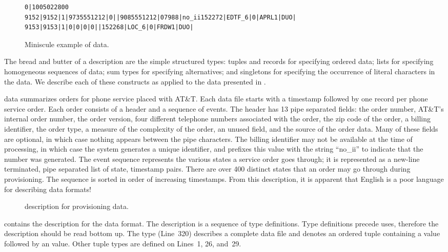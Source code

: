 \begin{figure*}
{\scriptsize
\begin{verbatim}
0|1005022800
9152|9152|1|9735551212|0||9085551212|07988|no_ii152272|EDTF_6|0|APRL1|DUO|
9153|9153|1|0|0|0|0||152268|LOC_6|0|FRDW1|DUO|
\end{verbatim}
}
  \caption{Miniscule example of \dibbler{} data.}
  \label{figure:dibbler-records}
\end{figure*}

The bread and butter of a \padsml{} description are the simple
structured types: tuples and records for specifying ordered data;
lists for specifying homogeneous sequences of data; sum types for
specifying alternatives; and singletons for specifying the occurrence
of literal characters in the data.  We describe each of these
constructs as applied to the \dibbler{} data presented in
.

\dibbler{} data summarizes orders for phone service placed with AT\&T.
Each \dibbler{} data file starts with a timestamp followed by one
record per phone service order.  Each order consists of a header and a
sequence of events.  The header has 13 pipe separated fields: the
order number, AT\&T's internal order number, the order version, four
different telephone numbers associated with the order, the zip code of
the order, a billing identifier, the order type, a measure of the
complexity of the order, an unused field, and the source of the order
data.  Many of these fields are optional, in which case nothing
appears between the pipe characters.  The billing identifier may not
be available at the time of processing, in which case the system
generates a unique identifier, and prefixes this value with the string
``no\_ii'' to indicate that the number was generated. The event
sequence represents the various states a service order goes through;
it is represented as a new-line terminated, pipe separated list of
state, timestamp pairs.  There are over 400 distinct states that an
order may go through during provisioning.  The sequence is sorted in
order of increasing timestamps.  From this description, it is apparent
that English is a poor language for describing data formats!

\begin{figure}

  \caption{\padsml{} description for \dibbler{} provisioning data.}
  \label{figure:sirius_pml}
\end{figure}

 contains the \padsml{} description for the
\dibbler{} data format.  The description is a sequence of type
definitions.  Type definitions precede uses, therefore the description
should be read bottom up.
The type  (Line~320) describes a complete \dibbler{} data
file and denotes an ordered tuple containing a
 value followed by an  value.
Other tuple types are defined on Lines~1, 26, and~29.

